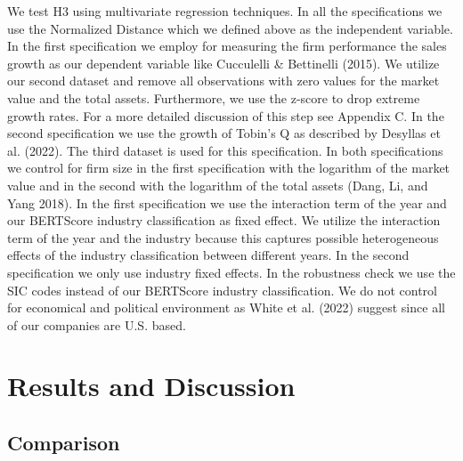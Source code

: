 \documentclass[
]{article}
\begin{document}
We test H3 using multivariate regression techniques. In all the
specifications we use the Normalized Distance which we defined above as
the independent variable. In the first specification we employ for
measuring the firm performance the sales growth as our dependent
variable like Cucculelli \& Bettinelli (2015). We utilize our second
dataset and remove all observations with zero values for the market
value and the total assets. Furthermore, we use the z-score to drop
extreme growth rates. For a more detailed discussion of this step see
Appendix C. In the second specification we use the growth of Tobin's Q
as described by Desyllas et al. (2022). The third dataset is used for
this specification. In both specifications we control for firm size in
the first specification with the logarithm of the market value and in
the second with the logarithm of the total assets (Dang, Li, and Yang
2018). In the first specification we use the interaction term of the
year and our BERTScore industry classification as fixed effect. We
utilize the interaction term of the year and the industry because this
captures possible heterogeneous effects of the industry classification
between different years. In the second specification we only use
industry fixed effects. In the robustness check we use the SIC codes
instead of our BERTScore industry classification. We do not control for
economical and political environment as White et al. (2022) suggest
since all of our companies are U.S. based.

\section{Results and Discussion}\label{results-and-discussion}

\subsection{Comparison}\label{comparison}
\end{document}
